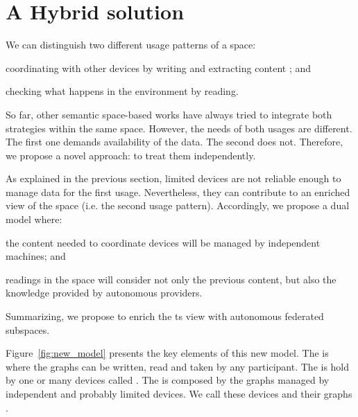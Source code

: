 \section{A Hybrid solution} %
\label{sec:hybrid_solution}

We can distinguish two different usage patterns of a space:
\begin{enumerate*}[label=\itshape(\arabic*\upshape)]
  \item coordinating with other devices by writing and extracting content ; and %
  \item checking what happens in the environment by reading.
\end{enumerate*}
So far, other semantic space-based works have always tried to integrate both strategies within the same space.
However, the needs of both usages are different.
The first one demands availability of the data.
The second does not. %
Therefore, we propose a novel approach: to treat them independently.



As explained in the previous section, limited devices are not reliable enough to manage data for the first usage.
Nevertheless, they can contribute to an enriched view of the space (i.e. the second usage pattern).
Accordingly, we propose a dual model where:
\begin{enumerate*}[label=\itshape(\arabic*\upshape)]
  \item the content needed to coordinate devices will be managed by independent machines; and
  \item readings in the space will consider not only the previous content, but also the knowledge provided by autonomous providers.
\end{enumerate*}
Summarizing, we propose to enrich the \ac{ts} view with autonomous federated subspaces.


Figure~\ref{fig:new_model} presents the key elements of this new model.
The \coordspace{} is where the graphs can be written, read and taken by any participant.
The \coordspace{} is hold by one or many devices called \coordinators{}.
The \outerspace{} is composed by the graphs managed by independent and probably limited devices.
We call these devices \asteroids{} and their graphs \selfgraphs{}.

